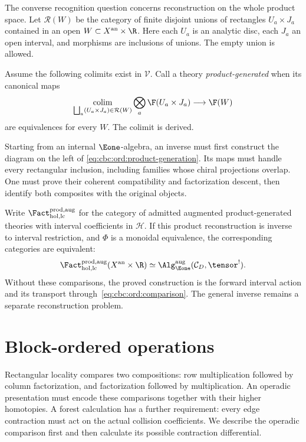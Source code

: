 The converse recognition question concerns reconstruction on the
whole product space.
Let $\mathcal R(W)$ be the category of finite disjoint unions of
rectangles $U_a\times J_a$ contained in an open
$W\subset X^{\mathrm{an}}\times\R$.
Here each $U_a$ is an analytic disc, each $J_a$ an open interval,
and morphisms are inclusions of unions. The empty union is allowed.

Assume the following colimits exist in $\mathcal V$.
Call a theory \emph{product-generated} when its canonical maps
\begin{equation}
 \mathop{\operatorname{colim}}_{\bigsqcup_a(U_a\times J_a)\in\mathcal R(W)}
       \bigotimes_a\F(U_a\times J_a)
       \longrightarrow\F(W)
 \label{eq:cbc:ord:product-generation}
\end{equation}
are equivalences for every $W$.
The colimit is derived.

Starting from an internal $\Eone$-algebra, an inverse must first
construct the diagram on the left of
\eqref{eq:cbc:ord:product-generation}.
Its maps must handle every rectangular inclusion, including families
whose chiral projections overlap.
One must prove their coherent compatibility and factorization descent,
then identify both composites with the original objects.

Write $\Fact_{\mathrm{hol,lc}}^{\mathrm{prod,aug}}$ for the category
of admitted augmented product-generated theories with interval coefficients
in $\mathcal H$.
If this product reconstruction is inverse to interval restriction,
and $\Phi$ is a monoidal equivalence,
the corresponding categories are equivalent:
\[
 \Fact_{\mathrm{hol,lc}}^{\mathrm{prod,aug}}
       (X^{\mathrm{an}}\times\R)
 \simeq
 \Alg_{\Eone}^{\mathrm{aug}}(\mathcal C_D,\tensor^!).
\]
Without these comparisons, the proved construction is the forward
interval action and its transport through~\eqref{eq:cbc:ord:comparison}.
The general inverse remains a separate reconstruction problem.

\chapter{Block-ordered operations}
Rectangular locality compares two compositions: row multiplication followed by column factorization, and factorization followed by multiplication. An operadic presentation must encode these comparisons together with their higher homotopies. A forest calculation has a further requirement: every edge contraction must act on the actual collision coefficients. We describe the operadic comparison first and then calculate its possible contraction differential.

